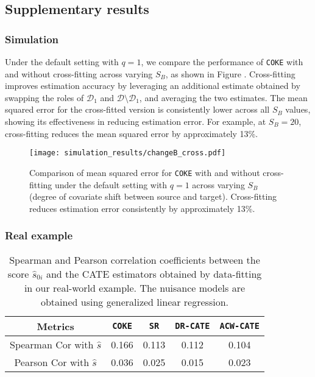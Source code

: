 \documentclass[12pt,a4paper,pdftex,onepage]{article}
\begin{document}
\subsection{Supplementary results}

\subsubsection{Simulation}\label{sec:app:simu}

Under the default setting with $q = 1$, we compare the performance of \texttt{COKE} with and without cross-fitting across varying $S_B$, as shown in Figure . Cross-fitting improves estimation accuracy by leveraging an additional estimate obtained by swapping the roles of $\mathcal{D}_1$ and $\mathcal{D} \setminus \mathcal{D}_1$, and averaging the two estimates. The mean squared error for the cross-fitted version is consistently lower across all $S_B$ values, showing its effectiveness in reducing estimation error. For example, at $S_B = 20$, cross-fitting reduces the mean squared error by approximately 13\%.


\begin{figure}[ht]
\centering
\texttt{[image: simulation\_results/changeB\_cross.pdf]}
\caption{Comparison of mean squared error for \texttt{COKE} with and without cross-fitting under the default setting with $q = 1$ across varying $S_B$ (degree of covariate shift between source and target). Cross-fitting reduces estimation error consistently by approximately 13\%.}
\label{fig:CF}
\end{figure}


\subsubsection{Real example}\label{sec:app:real:results}

\begin{table}[htbp]
\centering
\begin{tabular}{|c|cccc|}
\hline Metrics & \texttt{COKE} & \texttt{SR} & \texttt{DR-CATE} & \texttt{ACW-CATE} \\
\hline Spearman Cor with $\hat{s}$ & 0.166 & 0.113 & 0.112 & 0.104 \\
\hline Pearson Cor with $\hat{s}$ & 0.036 & 0.025 & 0.015 & 0.023  \\ 
\hline
\end{tabular}
\caption{\label{tab:res:401:datasplit} Spearman and Pearson correlation coefficients between the score $\hat{s}_{0i}$ and the CATE estimators obtained by data-fitting in our real-world example. The nuisance models are obtained using generalized linear regression.}
\end{table}
\end{document}
